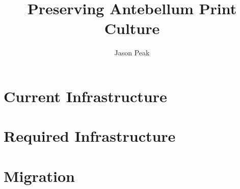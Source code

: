 \documentclass[oneside, 12pt]{article}
\begin{document}
\title{Preserving Antebellum Print Culture}
\author{Jason Peak}

\maketitle



\def\projectname{Poe's Magazine World}
\def\apc{Antebellum Print Culture}
\def\bwj{\emph{The Broadway Journal}}
\def\slm{\emph{Southern Literary Messenger}}
\def\bgm{\emph{Burton's Gentleman's Magazine}}
\def\gm{\emph{Graham's Magazine}}
\def\maglist{\bgm, \bwj, \gm, and the \slm}

\def\needcite{[citation]}
\def\needswork{[needs much work for inclusion]}

\begin{abstract}
    
\end{abstract}

%

%




%
\section{Current Infrastructure}


\section{Required Infrastructure}



\section{Migration}

\end{document}
